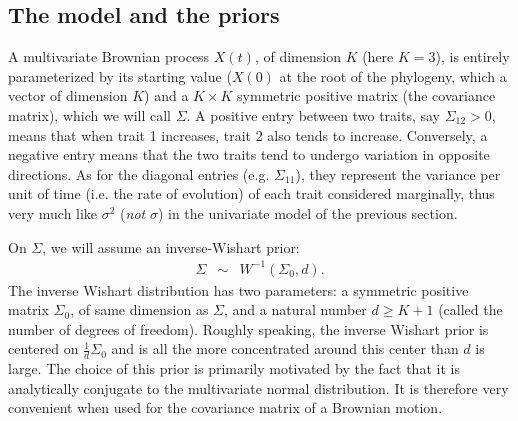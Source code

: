 \documentclass[usletter]{article}
\begin{document}
\subsection*{The model and the priors}

A multivariate Brownian process $X(t)$, of dimension $K$ (here $K=3$),
is entirely parameterized by its starting value ($X(0)$ at the root of the phylogeny, which a vector of dimension $K$) and a $K \times K$ symmetric positive matrix (the covariance matrix), which we will call $\Sigma$.
A positive entry between two traits, say $\Sigma_{12} > 0$, means that when trait 1 increases, trait 2 also tends to increase. Conversely, a negative entry means that the two traits tend to undergo variation in opposite directions.
As for the diagonal entries (e.g. $\Sigma_{11}$), they represent the variance per unit of time (i.e. the rate of evolution) of each trait considered marginally,
thus very much like $\sigma^2$ (\emph{not} $\sigma$) in the univariate model of the previous section.

On $\Sigma$, we will assume an inverse-Wishart prior:
\begin{eqnarray*}
\Sigma &\sim& W^{-1}(\Sigma_0, d).
\end{eqnarray*}
The inverse Wishart distribution has two parameters: a symmetric positive matrix $\Sigma_0$, of same dimension as $\Sigma$, and a natural number $d \ge K+1$ (called the number of degrees of freedom). Roughly speaking, the inverse Wishart prior is centered on $\frac{1}{d} \Sigma_0$ and is all the more concentrated around this center than $d$ is large.
The choice of this prior is primarily motivated by the fact that it is analytically conjugate to the multivariate normal distribution. It is therefore very convenient when used for the covariance matrix of a Brownian motion.
\end{document}
